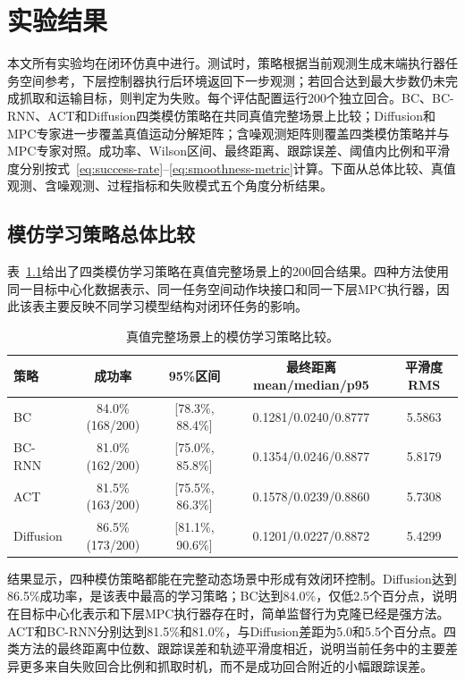 \chapter{实验结果}\label{chap:results}

本文所有实验均在闭环仿真中进行。测试时，策略根据当前观测生成末端执行器任务空间参考，下层控制器执行后环境返回下一步观测；若回合达到最大步数仍未完成抓取和运输目标，则判定为失败。每个评估配置运行200个独立回合。BC、BC-RNN、ACT和Diffusion四类模仿策略在共同真值完整场景上比较；Diffusion和MPC专家进一步覆盖真值运动分解矩阵；含噪观测矩阵则覆盖四类模仿策略并与MPC专家对照。成功率、Wilson区间、最终距离、跟踪误差、阈值内比例和平滑度分别按式~\eqref{eq:success-rate}--\eqref{eq:smoothness-metric}计算。下面从总体比较、真值观测、含噪观测、过程指标和失败模式五个角度分析结果。

\section{模仿学习策略总体比较}

表~\ref{tab:imitation-baselines}给出了四类模仿学习策略在真值完整场景上的200回合结果。四种方法使用同一目标中心化数据表示、同一任务空间动作块接口和同一下层MPC执行器，因此该表主要反映不同学习模型结构对闭环任务的影响。

\begin{table}[!htbp]
    \caption{真值完整场景上的模仿学习策略比较。}
    \label{tab:imitation-baselines}
    \centering
    \small
    \begin{tabular}{lcccc}
        \hline
        策略 & 成功率 & 95\%区间 & 最终距离mean/median/p95 & 平滑度RMS \\
        \hline
        BC & 84.0\% (168/200) & [78.3\%, 88.4\%] & 0.1281/0.0240/0.8777 & 5.5863 \\
        BC-RNN & 81.0\% (162/200) & [75.0\%, 85.8\%] & 0.1354/0.0246/0.8877 & 5.8179 \\
        ACT & 81.5\% (163/200) & [75.5\%, 86.3\%] & 0.1578/0.0239/0.8860 & 5.7308 \\
        Diffusion & 86.5\% (173/200) & [81.1\%, 90.6\%] & 0.1201/0.0227/0.8872 & 5.4299 \\
        \hline
    \end{tabular}
\end{table}

结果显示，四种模仿策略都能在完整动态场景中形成有效闭环控制。Diffusion达到86.5\%成功率，是该表中最高的学习策略；BC达到84.0\%，仅低2.5个百分点，说明在目标中心化表示和下层MPC执行器存在时，简单监督行为克隆已经是强方法。ACT和BC-RNN分别达到81.5\%和81.0\%，与Diffusion差距为5.0和5.5个百分点。四类方法的最终距离中位数、跟踪误差和轨迹平滑度相近，说明当前任务中的主要差异更多来自失败回合比例和抓取时机，而不是成功回合附近的小幅跟踪误差。

